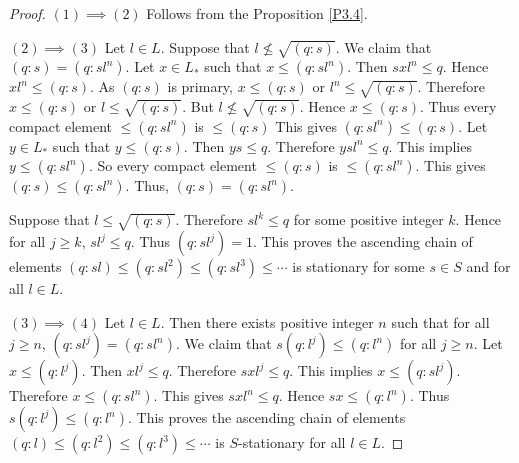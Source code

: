 \documentclass[10pt,twoside,a4paper]{amsart}
\numberwithin{equation}{section}
\theoremstyle{plain}
\theoremstyle{definition}
\begin{document}
\begin{proof} 
	
	$(1) \implies (2)$ Follows from the Proposition \ref{P3.4}.
	
	$(2)\implies (3)$ Let $l \in L$. Suppose that $l \nleq \sqrt{(q:s)}$. We claim that $(q:s) = (q:sl^n)$. Let $x \in L_*$ such that $x \leq (q:sl^n)$. Then $sxl^n\leq q$. Hence $xl^n\leq (q:s)$. As $(q:s)$ is primary, $x\leq (q:s)$ or $l^n\leq \sqrt{(q:s)}$. Therefore $x\leq (q:s)$ or $l \leq \sqrt{(q:s)}$. But $l \nleq \sqrt{(q:s)}$. Hence $x\leq (q:s)$. Thus every compact element $\leq (q:sl^n)$ is $\leq (q:s) $ This gives $(q:sl^n)\leq (q:s)$. Let $y \in L_{*}$ such that $y\leq (q:s)$. Then $ys\leq q$. Therefore $ysl^n\leq q$. This implies $y\leq (q:sl^n)$. So every compact element $\leq (q:s) $  is  $\leq (q:sl^n)$. This gives $(q:s) \leq (q:sl^n)$. Thus, $(q:s) = (q:sl^n)$. 
	\par Suppose that $l \leq \sqrt{(q:s)}$. Therefore $sl^k\leq q$ for some positive integer $k$. Hence for all $j\geq k$, $sl^j\leq q$. Thus $(q:sl^j)=1$. This proves the ascending chain of elements $(q:sl) \leq (q:sl^2) \leq (q:sl^3) \leq \cdots $ is stationary for some $s \in S$ and for all $l \in L$.
	
	$(3)\implies (4)$ Let $l \in L$. Then there exists positive integer $n$ such that for all $j \geq n$, $(q:sl^j)=(q:sl^n)$. We claim that $s(q:l^j)\leq (q:l^n)$ for all $j\geq n$. Let $x\leq (q:l^j)$. Then $xl^j\leq q$. Therefore $sxl^j\leq q$. This implies $x\leq (q:sl^j)$. Therefore $x\leq (q:sl^n)$. This gives $sxl^n\leq q$. Hence $sx\leq (q:l^n)$. Thus $s(q:l^j)\leq (q:l^n)$. This proves the ascending chain of elements $(q:l) \leq (q:l^2) \leq (q:l^3) \leq \cdots $ is $S$-stationary for all $l \in L$.
\end{proof}	
\end{document}
